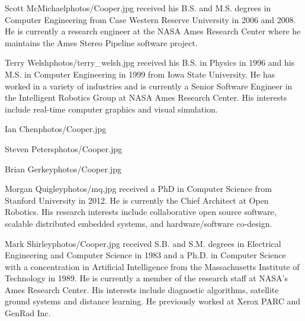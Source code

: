 \documentclass[twocolumn,letterpaper]{IEEEAerospaceCLS}  %
\begin{document}
\begin{biographywithpic}
{Scott McMichael}{photos/Cooper.jpg} received his B.S. 
and M.S. degrees in Computer Engineering from Case Western Reserve University in 2006 and 2008.  He is currently a research engineer at the NASA Ames Research Center where he maintains the Ames Stereo Pipeline software project.
\end{biographywithpic} 

\begin{biographywithpic}
{Terry Welsh}{photos/terry_welsh.jpg} received his B.S. in Physics in 1996 and his M.S. in Computer Engineering in 1999 from Iowa State University. He has worked in a variety of industries and is currently a Senior Software Engineer in the Intelligent Robotics Group at NASA Ames Research Center. His interests include real-time computer graphics and visual simulation.
\end{biographywithpic} 

\begin{biographywithpic}
{Ian Chen}{photos/Cooper.jpg} 
\end{biographywithpic} 

\begin{biographywithpic}
{Steven Peters}{photos/Cooper.jpg} 
\end{biographywithpic} 

\begin{biographywithpic}
{Brian Gerkey}{photos/Cooper.jpg} 
\end{biographywithpic} 

\begin{biographywithpic}
{Morgan Quigley}{photos/mq.jpg} received a PhD in Computer Science from Stanford University in 2012. He is currently the Chief Architect at Open Robotics. His research interests include collaborative open source software, scalable distributed embedded systems, and hardware/software co-design.
\end{biographywithpic} 

\begin{biographywithpic}
{Mark Shirley}{photos/Cooper.jpg} received S.B. and S.M. degrees in Electrical Engineering and Computer Science in 1983 and a Ph.D. in Computer Science with a concentration in Artificial Intelligence from the Massachusetts Institute of Technology in 1989.  He is currently a member of the research staff at NASA's Ames Research Center.  His interests include diagnostic algorithms, satellite ground systems and distance learning.  He previously worked at Xerox PARC and GenRad Inc.
\end{biographywithpic} 
\end{document}
